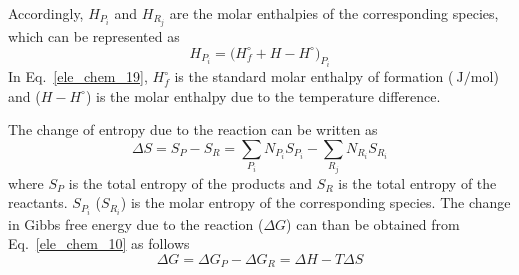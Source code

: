 \documentclass[11pt,a4paper]{article}
\numberwithin{equation}{section}
\theoremstyle{it}
\theoremstyle{definition}
\begin{document}
Accordingly, $H_{P_i}$ and $H_{R_j}$ are the molar enthalpies of the corresponding species, which can be represented as
\begin{equation}\label{ele_chem_19}
	H_{P_i}=\Big(H_f^\circ+H-H^\circ\Big)_{P_i}
\end{equation}
In Eq.~\eqref{ele_chem_19}, $H_f^\circ$ is the standard molar enthalpy of formation ($\SI{}{\joule\per\mole}$) and ($H-H^\circ$) is the molar enthalpy due to the temperature difference.

The change of entropy due to the reaction can be written as
\begin{equation}\label{ele_chem_20}
	\Delta S = S_P-S_R = \sum_{P_i}N_{P_i}S_{P_i}-\sum_{R_j}N_{R_i}S_{R_i}
\end{equation}
where $S_P$ is the total entropy of the products and $S_R$ is the total entropy of the reactants. $S_{P_i}$ ($S_{R_i}$) is the molar entropy of the corresponding species. The change in Gibbs free energy due to the reaction ($\Delta G$) can than be obtained from Eq.~\eqref{ele_chem_10} as follows
\begin{equation}\label{ele_chem_21}
	\Delta G = \Delta G_P - \Delta G_R=\Delta H-T\Delta S
\end{equation}
\end{document}
